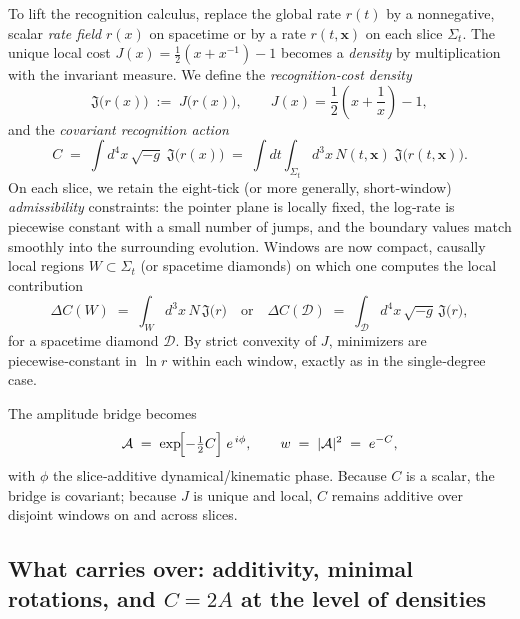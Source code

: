 \documentclass[11pt,letterpaper]{article}
\begin{document}
To lift the recognition calculus, replace the global rate \(r(t)\) by a nonnegative, scalar \emph{rate field} \(r(x)\) on spacetime or by a rate \(r(t,\mathbf x)\) on each slice \(\Sigma_t\). The unique local cost \(J(x)=\tfrac12(x+x^{-1})-1\) becomes a \emph{density} by multiplication with the invariant measure. We define the \emph{recognition‑cost density}
\begin{equation}
\mathfrak J\bigl(r(x)\bigr)\;:=\;J\!\bigl(r(x)\bigr),
\qquad
J(x)=\frac12\!\left(x+\frac1x\right)-1,
\end{equation}
and the \emph{covariant recognition action}
\begin{equation}
C \;=\; \int d^4x\,\sqrt{-g}\;\mathfrak J\bigl(r(x)\bigr)
\;=\; \int dt \int_{\Sigma_t} d^3x\,N(t,\mathbf x)\; \mathfrak J\bigl(r(t,\mathbf x)\bigr).
\end{equation}
On each slice, we retain the eight‑tick (or more generally, short‑window) \emph{admissibility} constraints: the pointer plane is locally fixed, the log‑rate is piecewise constant with a small number of jumps, and the boundary values match smoothly into the surrounding evolution. Windows are now compact, causally local regions \(W \subset \Sigma_t\) (or spacetime diamonds) on which one computes the local contribution
\begin{equation}
\Delta C(W)\;=\;\int_{W} d^3x\,N\, \mathfrak J\bigl(r\bigr)
\quad \text{or} \quad
\Delta C(\mathcal D)\;=\;\int_{\mathcal D} d^4x\,\sqrt{-g}\, \mathfrak J\bigl(r\bigr),
\end{equation}
for a spacetime diamond \(\mathcal D\). By strict convexity of \(J\), minimizers are piecewise‑constant in \(\ln r\) within each window, exactly as in the single‑degree case.

The amplitude bridge becomes
\begin{equation}
\mathcal A \;=\; \exp\!\Bigl[-\tfrac12 C\Bigr]\;e^{\,i\phi},
\qquad
w\;=\;|\mathcal A|^2\;=\;e^{-C},
\end{equation}
with \(\phi\) the slice‑additive dynamical/kinematic phase. Because \(C\) is a scalar, the bridge is covariant; because \(J\) is unique and local, \(C\) remains additive over disjoint windows on and across slices.

\subsection{What carries over: additivity, minimal rotations, and \(C=2A\) at the level of densities}
\end{document}
